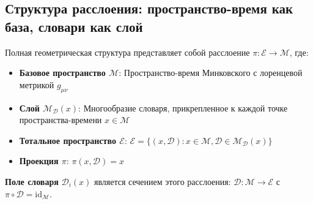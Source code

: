 \documentclass[11pt,a4paper]{article}
\begin{document}
	\subsection{Структура расслоения: пространство-время как база, словари как слой}
	Полная геометрическая структура представляет собой расслоение $\pi: \mathcal{E} \to \mathcal{M}$, где:
	\begin{itemize}
		\item \textbf{Базовое пространство $\mathcal{M}$}: Пространство-время Минковского с лоренцевой метрикой $g_{\mu\nu}$
		\item \textbf{Слой $\mathcal{M}_{\mathcal{D}}(x)$}: Многообразие словаря, прикрепленное к каждой точке пространства-времени $x \in \mathcal{M}$
		\item \textbf{Тотальное пространство $\mathcal{E}$}: $\mathcal{E} = \{(x, \mathcal{D}) : x \in \mathcal{M}, \mathcal{D} \in \mathcal{M}_{\mathcal{D}}(x)\}$
		\item \textbf{Проекция $\pi$}: $\pi(x, \mathcal{D}) = x$
	\end{itemize}
	
	\textbf{Поле словаря} $\mathcal{D}_i(x)$ является сечением этого расслоения: $\mathcal{D}: \mathcal{M} \to \mathcal{E}$ с $\pi \circ \mathcal{D} = \text{id}_{\mathcal{M}}$.
	
\end{document}
